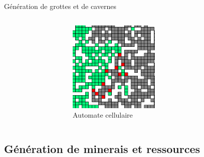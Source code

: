 \documentclass[aspectratio=169]{beamer}
\begin{document}
\begin{frame}{Génération de grottes et de cavernes}
    \begin{columns}
        \centering
        \begin{column}{0.5\textwidth}
            \centering
            \lipsum[1][1-5]
        \end{column}
        \begin{column}{0.5\textwidth}
            \centering
            \begin{figure}
                \centering
                \captionsetup{format=sanslabel}
                \includegraphics[width=0.5\textwidth]{assets/automate_cellulaire.png}
                \caption{Automate cellulaire}
            \end{figure}
        \end{column}
    \end{columns}
\end{frame}

\subsection{Génération de minerais et ressources}
\end{document}
